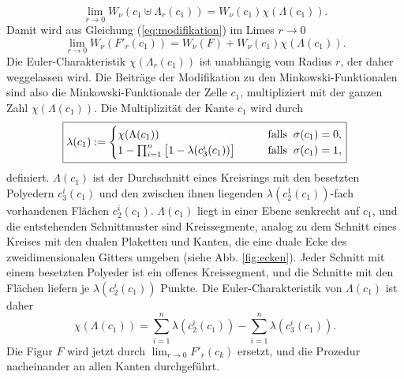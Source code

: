 \begin{equation}
 \lim_{r \rightarrow 0} W_{\nu}(c_1\uplus\Lambda_r(c_1))=W_{\nu}(c_1)\chi(\Lambda(c_1)).
\end{equation}
Damit wird aus Gleichung (\ref{eq:modifikation}) im Limes $r \rightarrow 0$
\begin{equation}
 \lim_{r\rightarrow 0} W_\nu(F'_r(c_1))=W_\nu\left(F\right)+W_\nu(c_1)\chi(\Lambda(c_1)).
\end{equation}
Die Euler-Charakteristik $\chi(\Lambda_r(c_1))$ ist unabh\"angig vom Radius $r$, der daher weggelassen wird. Die Beitr\"age der Modifikation zu den Minkowski-Funktionalen sind also die Minkowski-Funktionale der Zelle $c_1$, multipliziert mit der ganzen Zahl $\chi(\Lambda(c_1))$. Die Multiplizit\"at der Kante $c_1$ wird durch 
\begin{equation}
\fbox{$ \displaystyle 
  \lambda(c_1):= \begin{cases} \chi(\Lambda(c_1)) \qquad & \text{falls} \;\; \sigma(c_1)=0, \\ 1-\prod_{i=1}^n\left[1-\lambda(c_3^i(c_1))\right] \qquad & \text{falls} \;\; \sigma(c_1)=1,
\end{cases}
$}
\end{equation}
definiert. $\Lambda(c_1)$ ist der Durchschnitt eines Kreisrings mit den besetzten Polyedern $c_3^i(c_1)$ und den zwischen ihnen liegenden $\lambda(c_2^1(c_1))$-fach vorhandenen Fl\"achen $c_2^i(c_1)$. $\Lambda(c_1)$ liegt in einer Ebene senkrecht auf $c_1$, und die entstehenden Schnittmuster sind Kreissegmente, analog zu dem Schnitt eines Kreises mit den dualen Plaketten und Kanten, die eine duale Ecke des zweidimensionalen Gitters umgeben (siehe Abb. \ref{fig:ecken}). Jeder Schnitt mit einem besetzten Polyeder ist ein offenes Kreissegment, und die Schnitte mit den Fl\"achen liefern je $\lambda(c_2^i(c_1))$ Punkte. Die Euler-Charakteristik von $\Lambda(c_1)$ ist daher
 \begin{equation}
 \chi(\Lambda(c_1))= \sum_{i=1}^n \lambda(c_2^i(c_1))-\sum_{i=1}^n\lambda(c_3^i(c_1)).
\end{equation}   
Die Figur $F$ wird jetzt durch $\lim_{r\rightarrow 0}F'_r(c_k)$ ersetzt, und die Prozedur nacheinander an allen Kanten durchgef\"uhrt. 
